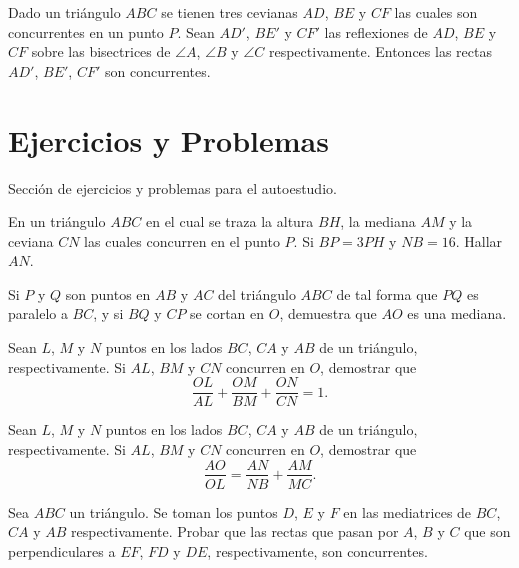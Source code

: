 \begin{section-definition}
    Dado un triángulo $ABC$ se tienen tres cevianas $AD$, $BE$ y $CF$ las cuales son concurrentes en un punto $P$.
    Sean $AD'$, $BE'$ y $CF'$ las reflexiones de $AD$, $BE$ y $CF$ sobre las bisectrices de $\angle A$, $\angle B$ y $\angle C$ respectivamente.
    Entonces las rectas $AD'$, $BE'$, $CF'$ son concurrentes.
\end{section-definition}

\section{Ejercicios y Problemas}
{
    Sección de ejercicios y problemas para el autoestudio.

    \begin{section-exercise}
        En un triángulo $ABC$ en el cual se traza la altura $BH$, la mediana $AM$ y la ceviana $CN$ las cuales concurren en el punto $P$.
        Si $BP = 3PH$ y $NB = 16$.
        Hallar $AN$.
    \end{section-exercise}

    \begin{section-exercise}
        Si $P$ y $Q$ son puntos en $AB$ y $AC$ del triángulo $ABC$ de tal forma que $PQ$ es paralelo a $BC$, y si $BQ$ y $CP$ se cortan en $O$, demuestra que $AO$ es una mediana.
    \end{section-exercise}

    \begin{section-exercise}
        Sean $L$, $M$ y $N$ puntos en los lados $BC$, $CA$ y $AB$ de un triángulo, respectivamente.
        Si $AL$, $BM$ y $CN$ concurren en $O$, demostrar que
        \[\frac{OL}{AL} + \frac{OM}{BM} + \frac{ON}{CN} = 1.\]
    \end{section-exercise}

    \begin{section-exercise}
        Sean $L$, $M$ y $N$ puntos en los lados $BC$, $CA$ y $AB$ de un triángulo, respectivamente.
        Si $AL$, $BM$ y $CN$ concurren en $O$, demostrar que
        \[\frac{AO}{OL} = \frac{AN}{NB} + \frac{AM}{MC}.\]
    \end{section-exercise}

    \begin{section-problem}
        Sea $ABC$ un triángulo.
        Se toman los puntos $D$, $E$ y $F$ en las mediatrices de $BC$, $CA$ y $AB$ respectivamente.
        Probar que las rectas que pasan por $A$, $B$ y $C$ que son perpendiculares a $EF$, $FD$ y $DE$, respectivamente, son concurrentes.
    \end{section-problem}
}